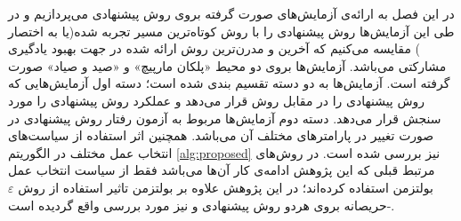 در این فصل به ارائه‌ی آزمایش‌های صورت گرفته بروی روش پیشنهادی می‌پردازیم و در طی این آزمایش‌ها روش‌ پیشنهادی را با روش کوتاه‌ترین مسیر تجربه شده(یا به اختصار ) مقایسه می‌کنیم که آخرین و مدرن‌ترین روش‌ ارائه شده در جهت بهبود یادگیری مشارکتی می‌باشد. آزما‌یش‌ها بروی دو محیط «پلکان مارپیچ» و «صید و صیاد» صورت گرفته است. آزمایش‌ها به دو دسته تقسیم بندی شده است؛ دسته اول آزمایش‌هایی که روش پیشنهادی را در مقابل روش  قرار می‌دهد و عملکرد روش پیشنهادی را مورد سنجش قرار می‌دهد. دسته دوم آزمایش‌ها مربوط به آزمون رفتار روش پیشنهادی در صورت تغییر در پارامتر‌های مختلف آن می‌باشد. همچنین اثر استفاده از سیاست‌های انتخاب عمل مختلف در الگوریتم \ref{alg:proposed} نیز بررسی شده است. در روش‌های مرتبط قبلی  که این پژوهش ادامه‌ی کار آن‌ها می‌باشد فقط از سیاست انتخاب عمل بولتزمن استفاده کرده‌اند؛ در این پژوهش علاوه بر بولتزمن تاثیر استفاده از روش $\varepsilon$-حریصانه بروی هردو روش پیشنهادی و  نیز مورد بررسی واقع گردیده است.